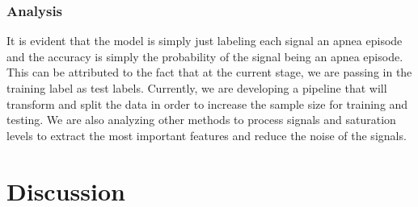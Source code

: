 \documentclass[12pt,titlepage]{article}
\begin{document}
\subsubsection{Analysis}
It is evident that the model is simply just labeling each signal an apnea episode and the accuracy is simply the probability of the signal being an apnea episode. This can be attributed to the fact that at the current stage, we are passing in the training label as test labels. Currently, we are developing a pipeline that will transform and split the data in order to increase the sample size for training and testing. We are also analyzing other methods to process signals and saturation levels to extract the most important features and reduce the noise of the signals.

\section{Discussion}
\end{document}
